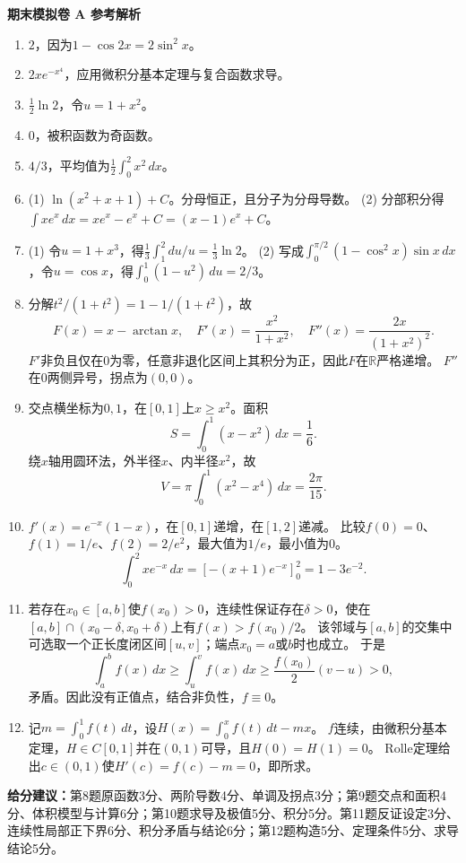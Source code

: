 \documentclass[11pt,a4paper,fontset=fandol]{ctexart}
\newcommand{\answerpaper}[1]{\clearpage\begin{center}{\LARGE\bfseries #1}\end{center}}
\begin{document}
\answerpaper{期末模拟卷 A 参考解析}
\begin{enumerate}
\item $2$，因为$1-\cos2x=2\sin^2x$。
\item $2xe^{-x^4}$，应用微积分基本定理与复合函数求导。
\item $\frac12\ln2$，令$u=1+x^2$。
\item $0$，被积函数为奇函数。
\item $4/3$，平均值为$\frac12\int_0^2x^2\,dx$。
\item (1) $\ln(x^2+x+1)+C$。分母恒正，且分子为分母导数。
(2) 分部积分得$\int xe^x\,dx=xe^x-e^x+C=(x-1)e^x+C$。
\item (1) 令$u=1+x^3$，得$\frac13\int_1^2du/u=\frac13\ln2$。
(2) 写成$\int_0^{\pi/2}(1-\cos^2x)\sin x\,dx$，令$u=\cos x$，得$\int_0^1(1-u^2)\,du=2/3$。
\item 分解$t^2/(1+t^2)=1-1/(1+t^2)$，故
\[F(x)=x-\arctan x,\quad F'(x)=\frac{x^2}{1+x^2},\quad
F''(x)=\frac{2x}{(1+x^2)^2}.\]
$F'$非负且仅在$0$为零，任意非退化区间上其积分为正，因此$F$在$\mathbb R$严格递增。
$F''$在$0$两侧异号，拐点为$(0,0)$。
\item 交点横坐标为$0,1$，在$[0,1]$上$x\ge x^2$。面积
\[S=\int_0^1(x-x^2)\,dx=\frac16.\]
绕$x$轴用圆环法，外半径$x$、内半径$x^2$，故
\[V=\pi\int_0^1(x^2-x^4)\,dx=\frac{2\pi}{15}.\]
\item $f'(x)=e^{-x}(1-x)$，在$[0,1]$递增，在$[1,2]$递减。
比较$f(0)=0$、$f(1)=1/e$、$f(2)=2/e^2$，最大值为$1/e$，最小值为$0$。
\[\int_0^2xe^{-x}\,dx=[-(x+1)e^{-x}]_0^2=1-3e^{-2}.\]
\item 若存在$x_0\in[a,b]$使$f(x_0)>0$，连续性保证存在$\delta>0$，使在$[a,b]\cap(x_0-\delta,x_0+\delta)$上有$f(x)>f(x_0)/2$。
该邻域与$[a,b]$的交集中可选取一个正长度闭区间$[u,v]$；端点$x_0=a$或$b$时也成立。
于是
\[\int_a^bf(x)\,dx\ge\int_u^vf(x)\,dx\ge\frac{f(x_0)}2(v-u)>0,\]
矛盾。因此没有正值点，结合非负性，$f\equiv0$。
\item 记$m=\int_0^1f(t)\,dt$，设$H(x)=\int_0^xf(t)\,dt-mx$。
$f$连续，由微积分基本定理，$H\in C[0,1]$并在$(0,1)$可导，且$H(0)=H(1)=0$。
Rolle定理给出$c\in(0,1)$使$H'(c)=f(c)-m=0$，即所求。
\end{enumerate}
\textbf{给分建议：}第8题原函数3分、两阶导数4分、单调及拐点3分；第9题交点和面积4分、体积模型与计算6分；第10题求导及极值5分、积分5分。第11题反证设定3分、连续性局部正下界6分、积分矛盾与结论6分；第12题构造5分、定理条件5分、求导结论5分。
\end{document}
